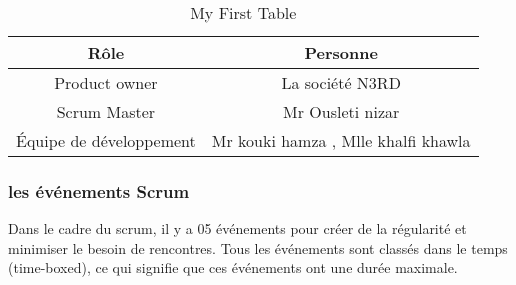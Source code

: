 \begin{table} [!ht]
	\centering
	\begin{tabular} {|c|c|}\hline
		Rôle & Personne \\  \hline
		Product owner     & La société N3RD      \\    \hline
		Scrum Master     & Mr Ousleti nizar    \\    \hline
		Équipe de développement    &  Mr kouki hamza ,
		Mlle khalfi khawla     \\    \hline	
		
	\end{tabular}
	\caption{My First Table}\label{tab: first-table}	
\end{table}
\clearpage
\subsubsection{les événements Scrum}
Dans le cadre du scrum, il y a 05 événements pour créer de la régularité et minimiser le besoin de rencontres. Tous les événements sont classés dans le temps (time-boxed), ce qui signifie que ces événements ont une durée maximale.
